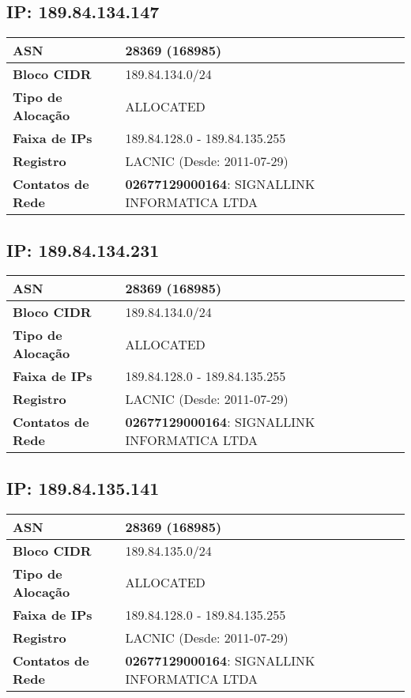     \subsection{IP: 189.84.134.147}
    \begin{tabular}{|l|l|}
    \hline
    \textbf{ASN} & 28369 (168985) \\ \hline
    \textbf{Bloco CIDR} & 189.84.134.0/24 \\ \hline
    \textbf{Tipo de Alocação} & ALLOCATED \\ \hline
    \textbf{Faixa de IPs} & 189.84.128.0 - 189.84.135.255 \\ \hline
    \textbf{Registro} & LACNIC (Desde: 2011-07-29) \\ \hline
        
\textbf{Contatos de Rede} & \textbf{02677129000164}: SIGNALLINK INFORMATICA LTDA 
\\ \hline
\end{tabular}


    \subsection{IP: 189.84.134.231}
    \begin{tabular}{|l|l|}
    \hline
    \textbf{ASN} & 28369 (168985) \\ \hline
    \textbf{Bloco CIDR} & 189.84.134.0/24 \\ \hline
    \textbf{Tipo de Alocação} & ALLOCATED \\ \hline
    \textbf{Faixa de IPs} & 189.84.128.0 - 189.84.135.255 \\ \hline
    \textbf{Registro} & LACNIC (Desde: 2011-07-29) \\ \hline
        
\textbf{Contatos de Rede} & \textbf{02677129000164}: SIGNALLINK INFORMATICA LTDA 
\\ \hline
\end{tabular}


    \subsection{IP: 189.84.135.141}
    \begin{tabular}{|l|l|}
    \hline
    \textbf{ASN} & 28369 (168985) \\ \hline
    \textbf{Bloco CIDR} & 189.84.135.0/24 \\ \hline
    \textbf{Tipo de Alocação} & ALLOCATED \\ \hline
    \textbf{Faixa de IPs} & 189.84.128.0 - 189.84.135.255 \\ \hline
    \textbf{Registro} & LACNIC (Desde: 2011-07-29) \\ \hline
        
\textbf{Contatos de Rede} & \textbf{02677129000164}: SIGNALLINK INFORMATICA LTDA 
\\ \hline
\end{tabular}


